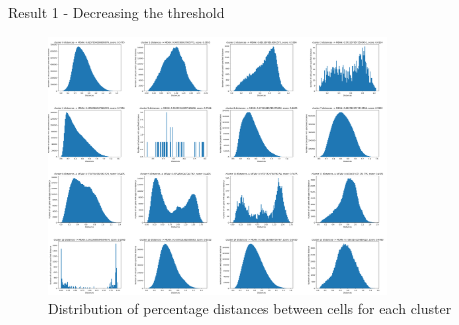 \documentclass{beamer}
\begin{document}
\begin{frame}{Result 1 - Decreasing the threshold}

\begin{figure}
    \centering
    \includegraphics[width=0.8\textwidth]{stats_clusters3.png}
    \caption{Distribution of percentage distances between cells for each cluster}
\end{figure} 

\end{frame}
\end{document}

